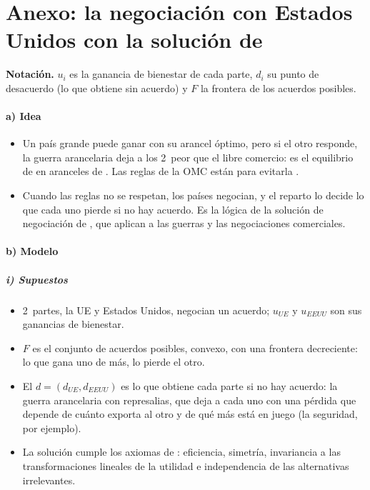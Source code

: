 \documentclass[11pt]{article}
\begin{document}
\clearpage
\section{Anexo: la negociación con Estados Unidos\cortetitulo{} con la solución de }\label{anexo:nash}

\begin{anotaciones}
\textbf{Notación.} $u_i$ es la ganancia de bienestar de cada parte, $d_i$ su punto de desacuerdo (lo que obtiene sin acuerdo) y $F$ la frontera de los acuerdos posibles.
\end{anotaciones}

\paragraph{a) Idea}

\begin{itemize}
\item Un país grande puede ganar con su arancel óptimo, pero si el otro responde, la guerra arancelaria deja a los 2~peor que el libre comercio: es el equilibrio de  en aranceles de \textcite{Johnson1953Optimum}  . Las reglas de la OMC están para evitarla .
\item Cuando las reglas no se respetan, los países negocian, y el reparto lo decide lo que cada uno pierde si no hay acuerdo. Es la lógica de la solución de negociación de \textcite{Nash1950Bargaining}, que \textcite{GrossmanHelpman1995TradeWars} aplican a las guerras y las negociaciones comerciales.
\end{itemize}

\paragraph{b) Modelo}

\subparagraph{i) Supuestos}

\begin{itemize}
\item 2~partes, la UE y Estados Unidos, negocian un acuerdo; $u_{\mathit{UE}}$ y $u_{\mathit{EEUU}}$ son sus ganancias de bienestar.
\item $F$ es el conjunto de acuerdos posibles, convexo, con una frontera decreciente: lo que gana uno de más, lo pierde el otro.
\item El  $d=(d_{\mathit{UE}},d_{\mathit{EEUU}})$ es lo que obtiene cada parte si no hay acuerdo: la guerra arancelaria con represalias, que deja a cada uno con una pérdida que depende de cuánto exporta al otro y de qué más está en juego (la seguridad, por ejemplo).
\item La solución cumple los axiomas de : eficiencia, simetría, invariancia a las transformaciones lineales de la utilidad e independencia de las alternativas irrelevantes.
\end{itemize}
\end{document}
